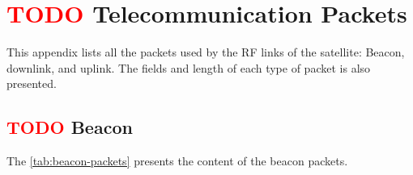 %
%
%
%
%

%
%
%
%
%
%

\chapter{ \textcolor{red}{TODO} Telecommunication Packets} \label{anx:packets}

This appendix lists all the packets used by the RF links of the satellite: Beacon, downlink, and uplink. The fields and length of each type of packet is also presented.

\section{ \textcolor{red}{TODO} Beacon}

The \autoref{tab:beacon-packets} presents the content of the beacon packets.

